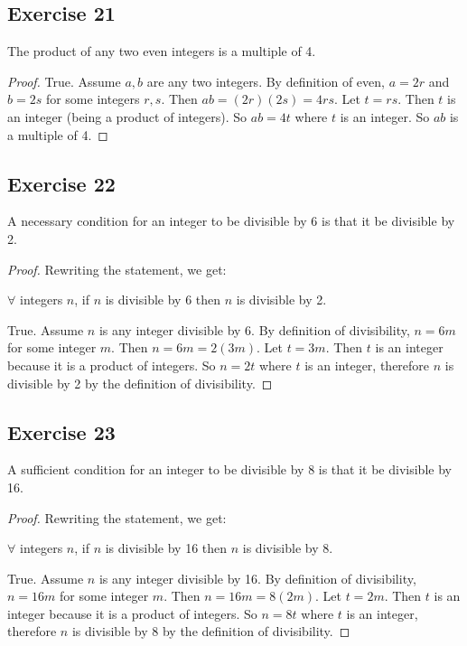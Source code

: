 \documentclass[14pt]{extarticle}
\newcommand{\fa}{\forall}
\begin{document}
\subsection{Exercise 21}
The product of any two even integers is a multiple of 4.

\begin{proof}
    True. Assume $a,b$ are any two integers. By definition of even, $a = 2r$ and $b = 2s$ for some integers $r,s$. Then $ab = (2r)(2s) = 4rs$. Let $t = rs$. Then $t$ is an integer (being a product of integers). So $ab = 4t$ where $t$ is an integer. So $ab$ is a multiple of 4.
\end{proof}

\subsection{Exercise 22}
A necessary condition for an integer to be divisible by 6 is that it be divisible by 2.

\begin{proof}
    Rewriting the statement, we get:

    $\fa$ integers $n$, if $n$ is divisible by 6 then $n$ is divisible by 2.

    True. Assume $n$ is any integer divisible by 6. By definition of divisibility, $n = 6m$ for some integer $m$. Then $n = 6m = 2(3m)$. Let $t = 3m$. Then $t$ is an integer because it is a product of integers. So $n = 2t$ where $t$ is an integer, therefore $n$ is divisible by 2 by the definition of divisibility.
\end{proof}

\subsection{Exercise 23}
A sufficient condition for an integer to be divisible by 8 is that it be divisible by 16.

\begin{proof}
    Rewriting the statement, we get:

    $\fa$ integers $n$, if $n$ is divisible by 16 then $n$ is divisible by 8.

    True. Assume $n$ is any integer divisible by 16. By definition of divisibility, $n = 16m$ for some integer $m$. Then $n = 16m = 8(2m)$. Let $t = 2m$. Then $t$ is an integer because it is a product of integers. So $n = 8t$ where $t$ is an integer, therefore $n$ is divisible by 8 by the definition of divisibility.
\end{proof}
\end{document}
